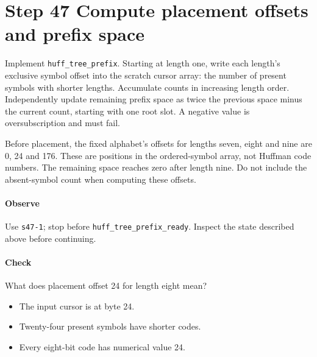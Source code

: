\section{Step 47 Compute placement offsets and prefix space}\label{png-huff-s47}
Implement \texttt{huff\_tree\_prefix}. Starting at length one, write each length's exclusive symbol offset into the scratch cursor array: the number of present symbols with shorter lengths. Accumulate counts in increasing length order. Independently update remaining prefix space as twice the previous space minus the current count, starting with one root slot. A negative value is oversubscription and must fail.

Before placement, the fixed alphabet's offsets for lengths seven, eight and nine are 0, 24 and 176. These are positions in the ordered-symbol array, not Huffman code numbers. The remaining space reaches zero after length nine. Do not include the absent-symbol count when computing these offsets.

\paragraph{Observe} Use \texttt{s47-1}; stop before \texttt{huff\_tree\_prefix\_ready}. Inspect the state described above before continuing.

\paragraph{Check} What does placement offset 24 for length eight mean?
\begin{itemize}
  \item[A.] The input cursor is at byte 24.
  \item[B.] Twenty-four present symbols have shorter codes.
  \item[C.] Every eight-bit code has numerical value 24.
\end{itemize}
